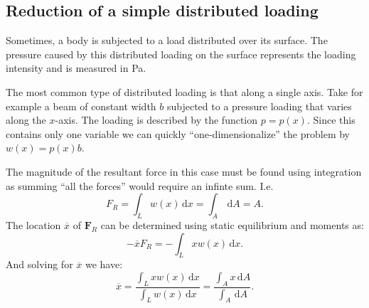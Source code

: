 \subsection{Reduction of a simple distributed loading}
Sometimes, a body is subjected to a load distributed over its surface. The pressure caused by this distributed loading on the surface represents the loading intensity and is measured in \unit{Pa}. 

The most common type of distributed loading is that along a single axis. Take for example a beam of constant width $b$ subjected to a pressure loading that varies along the $x$-axis. The loading is described by the function $p = p(x)$. Since this contains only one variable we can quickly ``one-dimensionalize'' the problem by $w(x) = p(x) b$. 

The magnitude of the resultant force in this case must be found using integration as summing ``all the forces'' would require an infinte sum. I.e.
\[ 
F_R = \int_{L} w(x) \, \mathrm{d}x = \int_A \, \mathrm{d}A = A
.\]
The location $\overline{x}$ of $\textbf{F}_R$ can be determined using static equilibrium and moments as:
\[ 
- \overline{x} F_R = - \int_L x w(x) \, \mathrm{d}x 
.\]
And solving for $\overline{x}$ we have:
\[ 
\overline{x} = \frac{\int_L x w (x) \, \mathrm{d}x}{\int_L w(x) \, \mathrm{d}x} = \frac{\int_A x \, \mathrm{d}A}{\int_A \, \mathrm{d}A}
.\]
